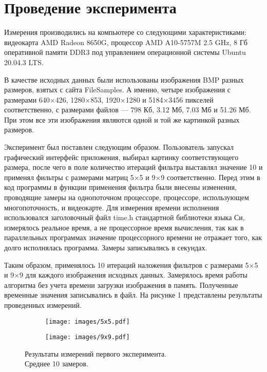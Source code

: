 \section{Проведение эксперимента}

Измерения производились на компьютере со следующими характеристиками: видеокарта AMD Radeon 8650G, процессор AMD A10-5757M 2.5 GHz, 
8 Гб оперативной памяти DDR3 под управлением операционной системы Ubuntu 20.04.3 LTS.

В качестве исходных данных были использованы изображения BMP разных размеров, взятых с сайта FileSamples\cite{filesamlpes}. 
А именно, четыре изображения с размерами 640×426, 1280×853, 1920×1280 и 5184×3456 пикселей соответственно, с размерами файлов --- 
798 Кб, 3.12 Мб, 7.03 Мб и 51.26 Мб. При этом все эти изображения являются одной и той же картинкой разных размеров.

Эксперимент был поставлен следующим образом. Пользователь запускал графический интерфейс приложения, выбирал картинку соответствующего 
размера, после чего в поле количество итераций фильтра выставлял значение 10 и применял фильтры с размерами матриц 5×5 и 9×9 соответственно. 
Перед этим в код программы в функции применения фильтра были внесены изменения, проводящие замеры на однопоточном процессоре, процессоре, 
использующем многопоточность, и видеокарте. Для измерения времени исполнения использовался заголовочный файл time.h стандартной библиотеки 
языка Си, измерялось реальное время, а не процессорное время вычисления, так как в параллельных программах значение процессорного времени 
не отражает того, как долго исполнялась программа. Замеры записывались в секундах.

Таким образом, применялось 10 итераций наложения фильтров с размерами 5×5 и 9×9 для каждого изображения исходных данных. 
Замерялось время работы алгоритма без учета времени загрузки изображения в память. Полученные временные значения записывались в файл. 
На рисунке 1 представлены результаты проведенных измерений.

\begin{figure}[htp]
\centering
    \begin{subfigure}{0.5\textwidth}
        \texttt{[image: images/5x5.pdf]}
    \end{subfigure}\hfill
    \begin{subfigure}{0.5\textwidth}
        \texttt{[image: images/9x9.pdf]}
    \end{subfigure}\hfill
\caption{Результаты измерений первого эксперимента.\\ Среднее 10 замеров.}
\end{figure}

